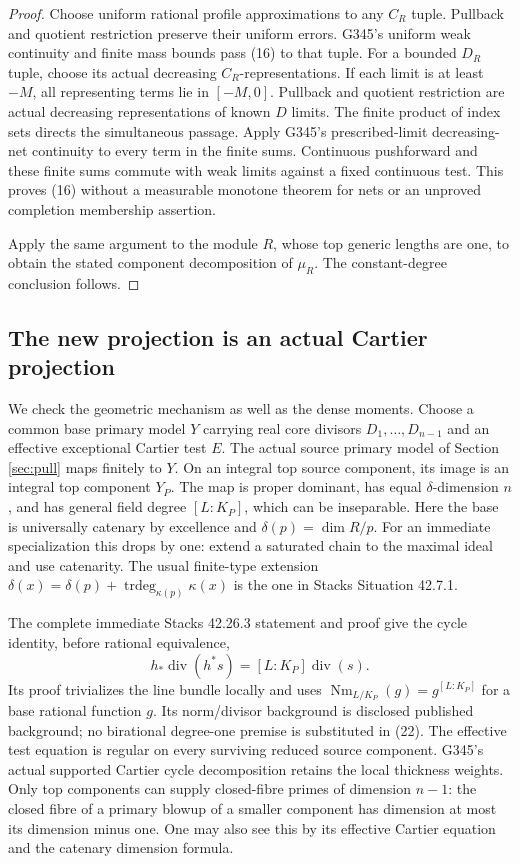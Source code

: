 \documentclass[11pt]{article}
\begin{document}
\begin{proof}
Choose uniform rational profile approximations to any \(C_R\)
tuple. Pullback and quotient restriction preserve their uniform
errors. G345's uniform weak continuity and finite mass bounds
pass (16) to that tuple. For a bounded \(D_R\) tuple, choose its
actual decreasing \(C_R\)-representations. If each limit is
at least \(-M\), all representing terms lie in \([-M,0]\).
Pullback and quotient restriction are actual decreasing
representations of known \(D\) limits. The finite product of
index sets directs the simultaneous passage. Apply G345's
prescribed-limit decreasing-net continuity to every term in
the finite sums. Continuous pushforward and these finite sums
commute with weak limits against a fixed continuous test.
This proves (16) without a measurable monotone theorem for nets
or an unproved completion membership assertion.

Apply the same argument to the module \(R\), whose top generic
lengths are one, to obtain the stated component decomposition
of \(\mu_R\). The constant-degree conclusion follows.
\end{proof}

\subsection*{The new projection is an actual Cartier projection}
We check the geometric mechanism as well as the dense moments.
Choose a common base primary model \(Y\) carrying real core
divisors \(D_1,\ldots,D_{n-1}\) and an effective exceptional
Cartier test \(E\). The actual source primary model of Section
\ref{sec:pull} maps finitely to \(Y\).
On an integral top source component, its image is an integral
top component \(Y_P\). The map is proper dominant, has equal
\(\delta\)-dimension \(n\), and has general field degree
\([L:K_P]\), which can be inseparable.
Here the base is universally catenary by excellence and
\(\delta(p)=\dim R/p\). For an immediate specialization this
drops by one: extend a saturated chain to the maximal ideal
and use catenarity. The usual finite-type extension
\(\delta(x)=\delta(p)+\operatorname{trdeg}_{\kappa(p)}\kappa(x)\)
is the one in Stacks Situation 42.7.1.

The complete immediate Stacks 42.26.3 statement and proof give
the cycle identity, before rational equivalence,
\[
 h_*\operatorname{div}(h^*s)
      =[L:K_P]\operatorname{div}(s).                          \tag{22}
\]
Its proof trivializes the line bundle locally and uses
\(\operatorname{Nm}_{L/K_P}(g)=g^{[L:K_P]}\) for a base rational
function \(g\). Its norm/divisor background is disclosed
published background; no birational degree-one premise is
substituted in (22).
The effective test equation is regular on every surviving
reduced source component. G345's actual supported Cartier
cycle decomposition retains the local thickness weights.
Only top components can supply closed-fibre primes of dimension
\(n-1\): the closed fibre of a primary blowup of a smaller
component has dimension at most its dimension minus one.
One may also see this by its effective Cartier equation and
the catenary dimension formula.
\end{document}
